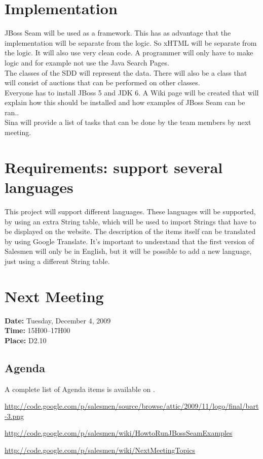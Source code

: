 \documentclass[a4paper, 12pt]{article}
\begin{document}
	\section{Implementation}
JBoss Seam will be used as a framework. This has as advantage that the implementation will be separate from the logic. So xHTML will be separate from the logic. It will also use very clean code. A programmer will only have to make logic and for example not use the Java Search Pages. \\
The classes of the SDD will represent the data. There will also be a class that will consist of auctions that can be performed on other classes. \\
Everyone has to install JBoss 5 and JDK 6. A Wiki page will be created that will explain how this should be installed and how examples of JBoss Seam can be ran.\cite{site2}. \\
Sina will provide a list of tasks that can be done by the team members by next meeting.

	\section{Requirements: support several languages}
This project will support different languages. These languages will be supported, by using an extra String table, which will be used to import Strings that have to be displayed on the website. The description of the items itself can be translated by using Google Translate. It's important to understand that the first version of Salesmen will only be in English, but it will be possible to add a new language, just using a different String table.
	
	\section{Next Meeting}

		\textbf{Date:} Tuesday, December 4, 2009\\
		\textbf{Time:} 15H00--17H00\\
		\textbf{Place:} D2.10\\
	
		\subsection{Agenda}
A complete list of Agenda items is available on \cite{site6}.\\
	
	\begin{thebibliography}{99}
		\href{http://code.google.com/p/salesmen/source/browse/attic/2009/11/logo/final/bart-3.png}{http://code.google.com/p/salesmen/source/browse/attic/2009/11/logo/final/bart-3.png}
		
			\href{http://code.google.com/p/salesmen/wiki/HowtoRunJBossSeamExamples}{http://code.google.com/p/salesmen/wiki/HowtoRunJBossSeamExamples}
		
		
		\href{http://code.google.com/p/salesmen/wiki/NextMeetingTopics}{http://code.google.com/p/salesmen/wiki/NextMeetingTopics}

		
	\end{thebibliography}	
		
\end{document}
